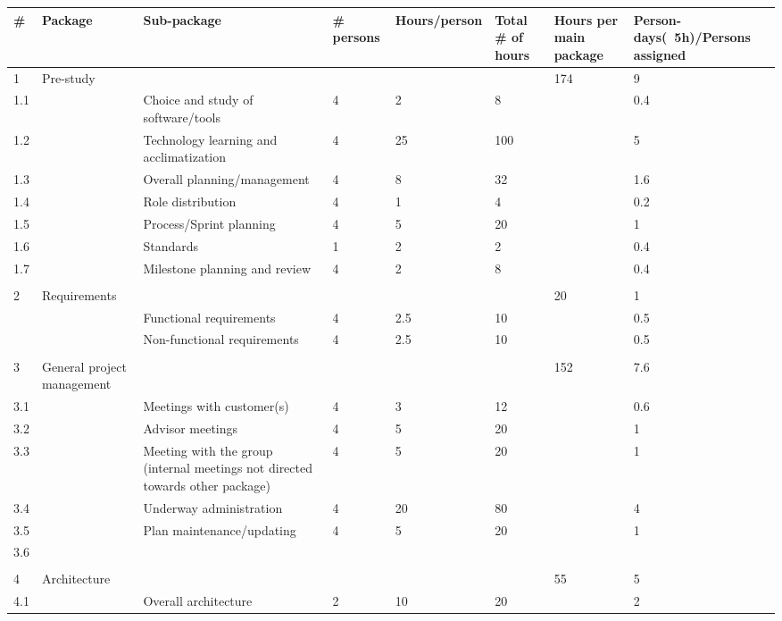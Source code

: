 \begin{table}

\begin{tabular}{|p{0.5cm}|p{2cm}|p{2cm}|p{2cm}|p{2cm}|p{2cm}|p{2cm}|p{2cm}|}
\hline
\# & Package & Sub-package & \# persons & Hours/person & Total \# of hours & Hours per main package & Person-days(~5h)/Persons assigned\\ 
\hline
1 & Pre-study &  &  &  &  & 174 & 9\\ 
\hline
1.1 &  & Choice and study of software/tools & 4 & 2 & 8 &  & 0.4\\ 
\hline
1.2 &  & Technology learning and acclimatization & 4 & 25 & 100 &  & 5\\ 
\hline
1.3 &  & Overall planning/management & 4 & 8 & 32 &  & 1.6\\ 
\hline
1.4 &  & Role distribution & 4 & 1 & 4 &  & 0.2\\ 
\hline
1.5 &  & Process/Sprint planning & 4 & 5 & 20 &  & 1\\ 
\hline
1.6 &  & Standards & 1 & 2 & 2 &  & 0.4\\ 
\hline
1.7 &  & Milestone planning and review & 4 & 2 & 8 &  & 0.4\\ 
\hline
 &  &  &  &  &  &  & \\ 
\hline
2 & Requirements &  &  &  &  & 20 & 1\\ 
\hline
 &  & Functional requirements & 4 & 2.5 & 10 &  & 0.5\\ 
\hline
 &  & Non-functional requirements & 4 & 2.5 & 10 &  & 0.5\\ 
\hline
 &  &  &  &  &  &  & \\ 
\hline
3 & General project management &  &  &  &  & 152 & 7.6\\ 
\hline
3.1 &  & Meetings with customer(s)  & 4 & 3 & 12 &  & 0.6\\ 
\hline
3.2 &  & Advisor meetings  & 4 & 5 & 20 &  & 1\\ 
\hline
3.3 &  & Meeting with the group (internal meetings not directed towards other package) & 4 & 5 & 20 &  & 1\\ 
\hline
3.4 &  & Underway administration & 4 & 20 & 80 &  & 4\\ 
\hline
3.5 &  & Plan maintenance/updating & 4 & 5 & 20 &  & 1\\ 
\hline
3.6 &  &  &  &  &  &  & \\ 
\hline
 &  &  &  &  &  &  & \\ 
\hline
4 & Architecture &  &  &  &  & 55 & 5\\ 
\hline
4.1 &  & Overall architecture & 2 & 10 & 20 &  & 2\\ 

\end{tabular}
\end{table}
